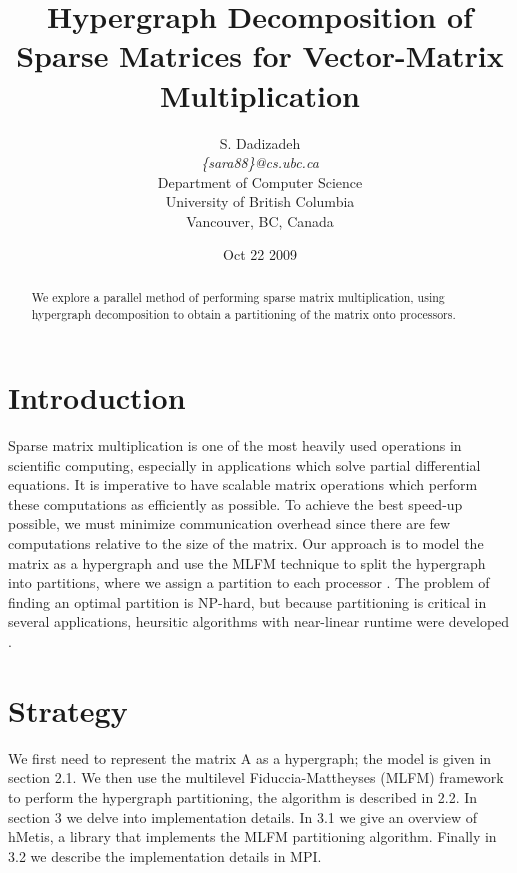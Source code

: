 \documentclass{article}
\title{
Hypergraph Decomposition of Sparse Matrices for Vector-Matrix Multiplication \\[0.3cm]
}
\author{S. Dadizadeh \\[0.1in]
{\em \{sara88\}@cs.ubc.ca} \\
Department of Computer Science \\
University of British Columbia \\
Vancouver, BC, Canada}
\date{Oct 22 2009}
\begin{document}

\pagestyle{myheadings}
\thispagestyle{firstheading}

\maketitle
\begin{abstract}

We explore a parallel method of performing sparse matrix multiplication, using hypergraph decomposition to obtain a partitioning of the matrix onto processors. 

\end{abstract}

\vspace{.125in}

\section{Introduction}

Sparse matrix multiplication is one of the most heavily used operations in scientific computing, especially in applications which solve partial differential equations. It is imperative to have scalable matrix operations which perform these computations as efficiently as possible. To achieve the best speed-up possible, we must minimize communication overhead since there are few computations relative to the size of the matrix. Our approach is to model the matrix as a hypergraph and use the MLFM technique to split the hypergraph into partitions, where we assign a partition to each processor \cite{hutchinson}. The problem of finding an optimal partition is NP-hard, but because partitioning is critical in several applications, heursitic algorithms with near-linear runtime were developed \cite{papa}. 

\section{Strategy}

We first need to represent the matrix A as a hypergraph; the model is given in section 2.1. We then use the multilevel Fiduccia-Mattheyses (MLFM) framework to perform the hypergraph partitioning, the algorithm is described in 2.2. In section 3 we delve into implementation details. In 3.1 we give an overview of hMetis, a library that implements the MLFM partitioning algorithm. Finally in 3.2 we describe the implementation details in MPI.
\end{document}
